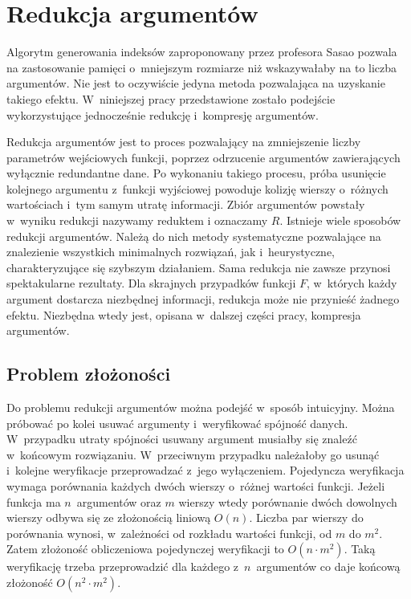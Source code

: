 \chapter{Redukcja argumentów}
\label{chapter:reduction}

Algorytm generowania indeksów zaproponowany przez profesora Sasao pozwala na zastosowanie pamięci o~mniejszym rozmiarze niż wskazywałaby na to liczba argumentów.
Nie jest to oczywiście jedyna metoda pozwalająca na uzyskanie takiego efektu.
W~niniejszej pracy przedstawione zostało podejście wykorzystujące jednocześnie redukcję i~kompresję argumentów.

Redukcja argumentów jest to proces pozwalający na zmniejszenie liczby parametrów wejściowych funkcji,
poprzez odrzucenie argumentów zawierających wyłącznie redundantne dane.
Po wykonaniu takiego procesu,
próba usunięcie kolejnego argumentu z~funkcji wyjściowej powoduje kolizję wierszy o~różnych wartościach i~tym samym utratę informacji.
Zbiór argumentów powstały w~wyniku redukcji nazywamy reduktem i oznaczamy $R$.
Istnieje wiele sposobów redukcji argumentów.
Należą do nich metody systematyczne
pozwalające na znalezienie wszystkich minimalnych rozwiązań,
jak i~heurystyczne,
charakteryzujące się szybszym działaniem.
Sama redukcja nie zawsze przynosi spektakularne rezultaty.
Dla skrajnych przypadków funkcji $F$,
w~których każdy argument dostarcza niezbędnej informacji,
redukcja może nie przynieść żadnego efektu.
Niezbędna wtedy jest,
opisana w~dalszej części pracy,
kompresja argumentów.

\section{Problem złożoności}

Do problemu redukcji argumentów można podejść w~sposób intuicyjny.
Można próbować po kolei usuwać argumenty i~weryfikować spójność danych.
W~przypadku utraty spójności usuwany argument musiałby się znaleźć w~końcowym rozwiązaniu.
W~przeciwnym przypadku należałoby go usunąć i~kolejne weryfikacje przeprowadzać z~jego wyłączeniem.
Pojedyncza weryfikacja wymaga porównania każdych dwóch wierszy o~różnej wartości funkcji.
Jeżeli funkcja ma $n$~argumentów oraz $m$ wierszy wtedy porównanie dwóch dowolnych wierszy odbywa się ze złożonością liniową $O(n)$.
Liczba par wierszy do porównania wynosi,
w~zależności od rozkładu wartości funkcji,
od $m$ do $m^2$.
Zatem złożoność obliczeniowa pojedynczej weryfikacji to $O(n \cdot m^2)$.
Taką weryfikację trzeba przeprowadzić dla każdego z~$n$~argumentów co daje końcową złożoność $O(n^2 \cdot m^2)$.

